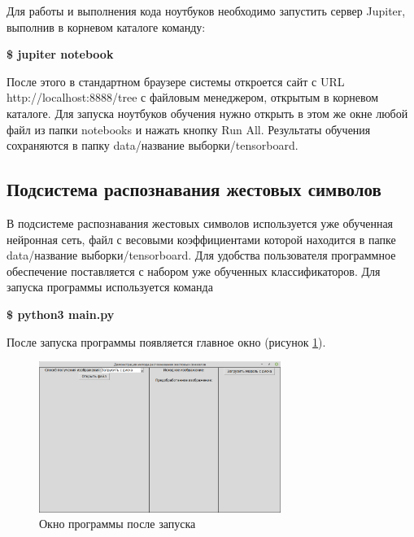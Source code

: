 Для работы и выполнения кода ноутбуков необходимо запустить сервер Jupiter, выполнив в корневом каталоге команду:

\textbf{\$ jupiter notebook}

После этого в стандартном браузере системы откроется сайт с URL http://localhost:8888/tree с файловым менеджером, открытым в корневом каталоге. Для запуска ноутбуков обучения нужно открыть в этом же окне любой файл из папки notebooks и нажать кнопку Run All. Результаты обучения сохраняются в папку data/название выборки/tensorboard.

\subsection*{Подсистема распознавания жестовых символов}

В подсистеме распознавания жестовых символов используется уже обученная нейронная сеть, файл с весовыми коэффициентами которой находится в папке data/название выборки/tensorboard. Для удобства пользователя программное обеспечение поставляется с набором уже обученных классификаторов. Для запуска программы используется команда 

\textbf{\$ python3 main.py}

После запуска программы появляется главное окно (рисунок \ref{impl:main_start}).

\begin{figure}[!h]
	\centering
	\includegraphics[width=0.7\textwidth]{inc/img/main_start}
	\caption{Окно программы после запуска}
	\label{impl:main_start}
\end{figure}

